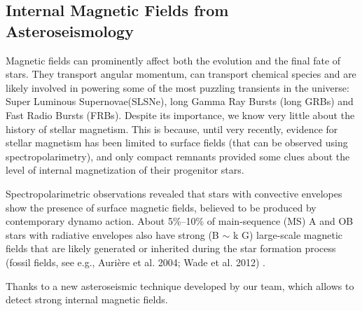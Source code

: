{\color{red}\subsection{Internal Magnetic Fields from Asteroseismology}}
Magnetic fields can prominently affect both the evolution and the final fate of stars. They transport angular momentum, can transport chemical species
and are likely involved in powering some of the most puzzling transients in the universe: Super Luminous Supernovae(SLSNe), long Gamma Ray Bursts (long GRBs) and Fast Radio Bursts (FRBs). 
Despite its importance, we know very little about the history of stellar magnetism. This is  because, until very recently, 
evidence for stellar magnetism has been limited to surface fields (that can be observed using spectropolarimetry),
and only compact remnants provided some clues about the level of internal magnetization of their progenitor stars.

Spectropolarimetric observations revealed that stars with convective envelopes show the presence of
surface magnetic fields, believed to be produced by contemporary dynamo action.
About 5\%–10\% of main-sequence (MS) A and OB stars with radiative envelopes also have strong (B $\sim$ k G)
large-scale magnetic fields that are likely generated or inherited during the star
formation process (fossil fields, see e.g., Aurière et al. 2004; Wade et al. 2012) . 

Thanks to a new asteroseismic technique developed by our team, which allows to detect strong internal magnetic fields.